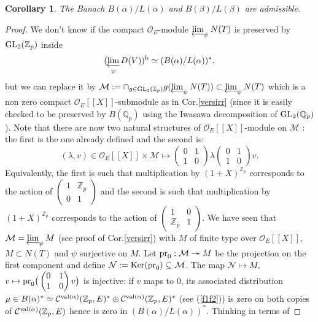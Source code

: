 \documentclass[11pt]{amsart}
\def\limproj{\mathop{\oalign{{\rm lim}\cr 
\hidewidth$\longleftarrow$\hidewidth\cr}}}
\def\Z{{\mathbb Z}_p}
\def\Q{{\mathbb Q}_p}
\def\G{{\rm GL}_2(\Q)}
\def\K{{\rm GL}_2(\Z)}
\def\O{{\mathcal O}_E}
\newtheorem{cor}[definit]{\bf{Corollary}}
\begin{document}
\begin{cor}\label{admissible} 
The Banach $B(\alpha)/L(\alpha)$ and $B(\beta)/L(\beta)$ are admissible. 
\end{cor} 
\begin{proof} 
We don't know if the compact $\O$-module $\limproj_{\psi}N(T)$ is
preserved by $\K$ inside $$(\limproj_{\psi}D(V))^{\rm b}\simeq
(B(\alpha)/L(\alpha))^*,$$ but we can replace it by ${\mathcal
  M}:=\cap_{g\in \K}g(\limproj_{\psi}N(T))\subset \limproj_{\psi}N(T)$
which is a non zero compact $\O[[X]]$-submodule as in
Cor.\ref{versirr} (since it is easily checked to be preserved by
$B(\Q)$ using the Iwasawa decomposition of $\G$). Note that there are
now two natural structures of $\O[[X]]$-module on ${\mathcal M}$ : the
first is the one already defined and the second is:  
$$(\lambda,v)\in \O[[X]]\times {\mathcal M}\mapsto
\begin{pmatrix}0&1\\1&0\end{pmatrix}\lambda\begin{pmatrix}0&1\\1&0\end{pmatrix}v.$$
  Equivalently, the first is such that multiplication by $(1+X)^{\Z}$
  corresponds to the action of $\begin{pmatrix}1&\Z\\0&1\end{pmatrix}$
    and the second is such that multiplication by $(1+X)^{\Z}$
    corresponds to the action of
    $\begin{pmatrix}1&0\\\Z&1\end{pmatrix}$. We have seen that
      ${\mathcal M}=\limproj_{\psi}M$ (see proof of Cor.\ref{versirr})
      with $M$ of finite type over $\O[[X]]$, $M\subset N(T)$ and
      $\psi$ surjective on $M$. Let ${\rm pr}_0:{\mathcal
	M}\twoheadrightarrow M$ be the projection on the first
      component and define ${\mathcal N}:={\rm Ker}({\rm
	pr}_0)\subsetneq {\mathcal M}$. The map ${\mathcal N}\mapsto
      M$, $v\mapsto {\rm
	pr}_0\big(\begin{pmatrix}0&1\\1&0\end{pmatrix}v\big)$ is
	injective: if $v$ maps to $0$, its associated distribution
	$\mu\in B(\alpha)^*\simeq {\mathcal C}^{{\rm
	    val}(\alpha)}(\Z,E)^*\oplus {\mathcal C}^{{\rm
	    val}(\alpha)}(\Z,E)^*$ (see (\ref{f1f2})) is zero on both
	copies of ${\mathcal C}^{{\rm val}(\alpha)}(\Z,E)$ hence is
	zero in $(B(\alpha)/L(\alpha))^*$. Thinking in terms of

\end{proof}
\end{document}
